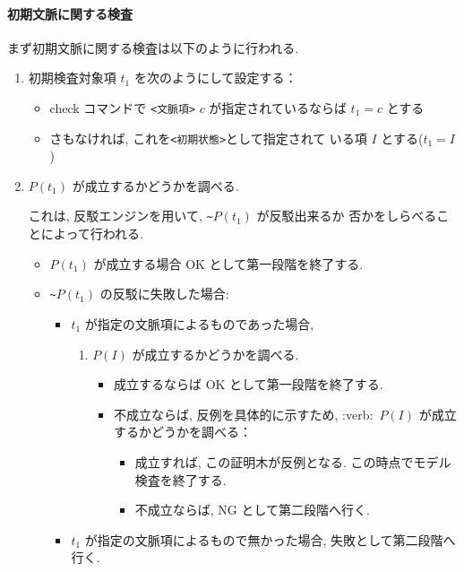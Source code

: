 \paragraph{初期文脈に関する検査}
まず初期文脈に関する検査は以下のように行われる.
\begin{enumerate}
\item 初期検査対象項 $t_1$ を次のようにして設定する：
  \begin{itemize}
  \item check コマンドで \texttt{<文脈項>} $c$ が指定されているならば
    $t_1 = c$ とする
  \item さもなければ, これを\texttt{<初期状態>}として指定されて
    いる項 $I$ とする($t_1 = I$)
  \end{itemize}
\item $P(t_1)$ が成立するかどうかを調べる.

  これは, 反駁エンジンを用いて, \verb:~:$P(t_1)$ が反駁出来るか
  否かをしらべることによって行われる.
  
  \begin{itemize}
  \item $P(t_1)$ が成立する場合 OK として第一段階を終了する.
  \item \verb:~:$P(t_1)$ の反駁に失敗した場合:
    \begin{itemize}
    \item $t_1$ が指定の文脈項によるものであった場合,
      \begin{enumerate}
      \item $P(I)$ が成立するかどうかを調べる.
        \begin{itemize}
        \item 成立するならば OK として第一段階を終了する.
        \item 不成立ならば, 反例を具体的に示すため,
          :verb:~$P(I)$ が成立するかどうかを調べる：
          \begin{itemize}
          \item 成立すれば, この証明木が反例となる.
            この時点でモデル検査を終了する.
          \item 不成立ならば, NG として第二段階へ行く.
          \end{itemize}
        \end{itemize}
      \end{enumerate}
    \item $t_1$ が指定の文脈項によるもので無かった場合,
      失敗として第二段階へ行く.
    \end{itemize}
  \end{itemize}
\end{enumerate}

